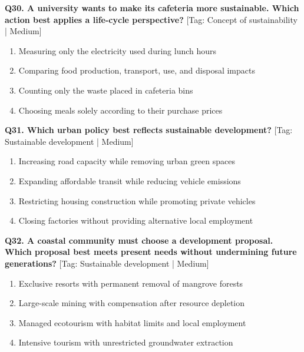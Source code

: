 \noindent\textbf{Q30. A university wants to make its cafeteria more sustainable. Which action best applies a life-cycle perspective?} \hfill [Tag: Concept of sustainability | Medium]
\begin{enumerate}[label=(\alph*),topsep=2pt,itemsep=1pt,partopsep=0pt,parsep=0pt]
    \item {Measuring only the electricity used during lunch hours}
    \item {Comparing food production, transport, use, and disposal impacts}
    \item {Counting only the waste placed in cafeteria bins}
    \item {Choosing meals solely according to their purchase prices}
\end{enumerate}
\vspace{2mm}

\noindent\textbf{Q31. Which urban policy best reflects sustainable development?} \hfill [Tag: Sustainable development | Medium]
\begin{enumerate}[label=(\alph*),topsep=2pt,itemsep=1pt,partopsep=0pt,parsep=0pt]
    \item {Increasing road capacity while removing urban green spaces}
    \item {Expanding affordable transit while reducing vehicle emissions}
    \item {Restricting housing construction while promoting private vehicles}
    \item {Closing factories without providing alternative local employment}
\end{enumerate}
\vspace{2mm}

\noindent\textbf{Q32. A coastal community must choose a development proposal. Which proposal best meets present needs without undermining future generations?} \hfill [Tag: Sustainable development | Medium]
\begin{enumerate}[label=(\alph*),topsep=2pt,itemsep=1pt,partopsep=0pt,parsep=0pt]
    \item {Exclusive resorts with permanent removal of mangrove forests}
    \item {Large-scale mining with compensation after resource depletion}
    \item {Managed ecotourism with habitat limits and local employment}
    \item {Intensive tourism with unrestricted groundwater extraction}
\end{enumerate}
\vspace{2mm}

